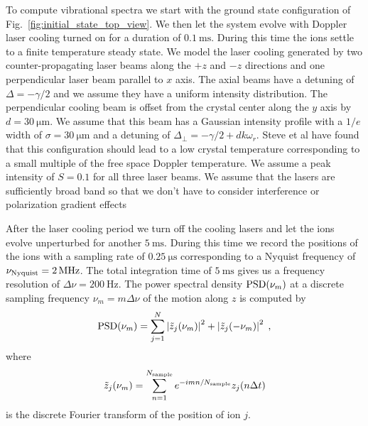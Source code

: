 \documentclass[aps, pra, preprint]{revtex4-1}
\begin{document}
To compute vibrational spectra we start with the ground state
configuration of Fig.~\ref{fig:initial_state_top_view}. We then
let the system evolve with Doppler laser cooling turned on for a
duration of $\SI{0.1}{\milli\second}$. During this time the ions
settle to a finite temperature steady state. We model the laser
cooling generated by two counter-propagating laser beams along
the $+z$ and $-z$ directions and one perpendicular laser beam
parallel to $x$ axis. The axial beams have a detuning of
$\Delta=-\gamma/2$ and we assume they have a uniform intensity
distribution. The perpendicular cooling beam is offset from the
crystal center along the $y$ axis by $d=\SI{30}{\micro\meter}$.
We assume that this beam has a Gaussian intensity profile with a
$1/e$ width of $\sigma=\SI{30}{\micro\meter}$ and a detuning of
$\Delta_\perp=-\gamma/2 +dk\omega_r$. Steve et al  have found that this configuration should
lead to a low crystal temperature corresponding to a small
multiple of the free space Doppler temperature. We assume a peak
intensity of $S=0.1$ for all three laser beams. We assume that
the lasers are sufficiently broad band so that we don't have to
consider interference or polarization gradient effects~

After the laser cooling period we turn off the cooling lasers and
let the ions evolve unperturbed for another
$\SI{5}{\milli\second}$. During this time we record the positions
of the ions with a sampling rate of $\SI{0.25}{\micro\second}$
corresponding to a Nyquist frequency of $\nu_{\rm
  Nyquist}=\SI{2}{\mega\hertz}$. The total integration time of
$\SI{5}{\milli\second}$ gives us a frequency resolution of
$\Delta\nu=\SI{200}{\hertz}$. The power spectral density ${\rm
  PSD}(\nu_m)$ at a discrete sampling frequency $\nu_m =
m\Delta\nu$ of the motion along $z$ is computed by
\begin{equation}
  {\rm PSD}(\nu_m)=
  \sum_{j=1}^N\left| \tilde{z}_j(\nu_m) \right|^2 +
  \left| \tilde{z}_j(-\nu_m) \right|^2\;,
\end{equation}
where
\begin{equation}
  \tilde{z}_j(\nu_m)=
  \sum_{n=1}^{N_{\rm sample}}e^{-imn/N_{\rm sample}}z_j(n\Delta t)
\end{equation}
is the discrete Fourier transform of the position of ion $j$.
\end{document}
